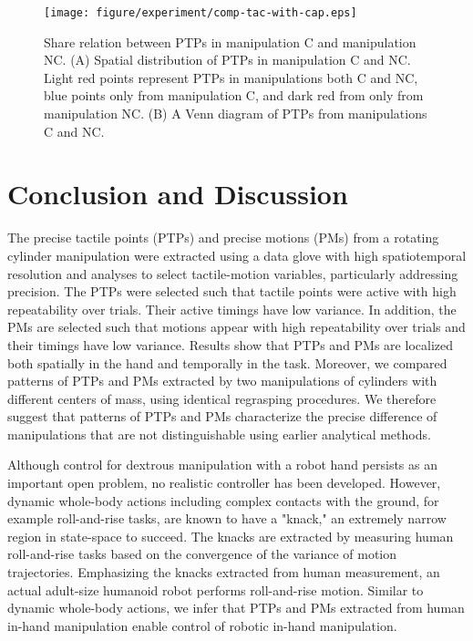 \documentclass[letterpaper, 10 pt, conference]{IEEEtran}  %
\begin{document}
\begin{figure}[!t]
 \centering
  \texttt{[image: figure/experiment/comp-tac-with-cap.eps]}
  \caption{Share relation between PTPs in manipulation C and manipulation NC. (A) Spatial distribution of PTPs in manipulation C and NC. Light red points represent PTPs in manipulations both C and NC, blue points only from manipulation C, and dark red from only from manipulation NC. (B) A Venn diagram of PTPs from manipulations C and NC.}
 \label{fig:comp-tac}
\end{figure}



\section{Conclusion and Discussion}
The precise tactile points (PTPs) and precise motions (PMs) from a rotating cylinder manipulation were extracted using a data glove with high spatiotemporal resolution and analyses to select tactile-motion variables, particularly addressing precision. The PTPs were selected such that tactile points were active with high repeatability over trials. Their active timings have low variance. In addition, the PMs are selected such that motions appear with high repeatability over trials and their timings have low variance. Results show that PTPs and PMs are localized both spatially in the hand and temporally in the task. Moreover, we compared patterns of PTPs and PMs extracted by two manipulations of cylinders with different centers of mass, using identical regrasping procedures. We therefore suggest that patterns of PTPs and PMs characterize the precise difference of manipulations that are not distinguishable using earlier analytical methods.

Although control for dextrous manipulation with a robot hand persists as an important open problem\cite{bicchi2000hands}, no realistic controller has been developed. However, dynamic whole-body actions including complex contacts with the ground, for example roll-and-rise tasks, are known to have a "knack," an extremely narrow region in state-space to succeed\cite{kuniyoshi2007emergence}. The knacks are extracted by measuring human roll-and-rise tasks based on the convergence of the variance of motion trajectories. Emphasizing the knacks extracted from human measurement, an actual adult-size humanoid robot performs roll-and-rise motion\cite{kuniyoshi2004dynamic}. Similar to dynamic whole-body actions, we infer that PTPs and PMs extracted from human in-hand manipulation enable control of robotic in-hand manipulation.
\end{document}
